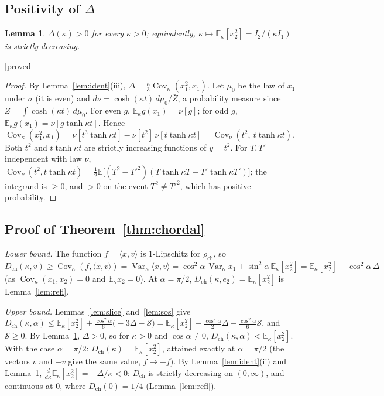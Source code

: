 \documentclass[11pt,a4paper]{article}
\newtheorem{lemma}[theorem]{Lemma}
\theoremstyle{remark}
\theoremstyle{definition}
\theoremstyle{plain}
\theoremstyle{remark}
\newcommand{\E}{\mathbb{E}}
\newcommand{\Cov}{\operatorname{Cov}}
\newcommand{\Var}{\operatorname{Var}}
\newcommand{\st}[1]{\textsf{[#1]}}
\newcommand{\Zb}{\bar Z}
\newcommand{\Dch}{D_{\mathrm{ch}}}
\newcommand{\rch}{\rho_{\mathrm{ch}}}
\begin{document}
\subsection{Positivity of $\Delta$}\label{sec:chdelta}

\begin{lemma}\label{lem:delta}
$\Delta(\kappa)>0$ for every $\kappa>0$; equivalently, $\kappa\mapsto\E_\kappa[x_2^2]=I_2/(\kappa I_1)$ is strictly decreasing.
\end{lemma}
\noindent\st{proved}
\begin{proof}
By Lemma~\ref{lem:ident}(iii), $\Delta=\frac\kappa3\Cov_\kappa(x_1^2,x_1)$. Let $\mu_0$ be the law of $x_1$ under $\bar\sigma$ (it is even) and
$d\nu=\cosh(\kappa t)\,d\mu_0/\Zb$, a probability measure since $\Zb=\int\cosh(\kappa t)\,d\mu_0$. For even $g$, $\E_\kappa g(x_1)=\nu[g]$; for odd $g$,
$\E_\kappa g(x_1)=\nu[g\tanh\kappa t]$. Hence
$\Cov_\kappa(x_1^2,x_1)=\nu[t^3\tanh\kappa t]-\nu[t^2]\,\nu[t\tanh\kappa t]=\Cov_\nu(t^2,\ t\tanh\kappa t)$.
Both $t^2$ and $t\tanh\kappa t$ are strictly increasing functions of $y=t^2$. For $T,T'$ independent with law $\nu$,
$\Cov_\nu(t^2,t\tanh\kappa t)=\frac12\E\big[(T^2-T'^2)(T\tanh\kappa T-T'\tanh\kappa T')\big]$; the integrand is $\ge0$, and $>0$ on the event
$T^2\ne T'^2$, which has positive probability.
\end{proof}

\subsection{Proof of Theorem~\ref{thm:chordal}}\label{sec:chmain}

\emph{Lower bound.} The function $f=\langle x,v\rangle$ is 1-Lipschitz for $\rch$, so $\Dch(\kappa,v)\ge\Cov_\kappa(f,\langle x,v\rangle)=\Var_\kappa\langle x,v\rangle
=\cos^2\!\alpha\,\Var_\kappa x_1+\sin^2\!\alpha\,\E_\kappa[x_2^2]=\E_\kappa[x_2^2]-\cos^2\!\alpha\,\Delta$ (as $\Cov_\kappa(x_1,x_2)=0$ and
$\E_\kappa x_2=0$). At $\alpha=\pi/2$, $\Dch(\kappa,e_2)=\E_\kappa[x_2^2]$ is Lemma~\ref{lem:refl}.

\emph{Upper bound.} Lemmas~\ref{lem:slice} and~\ref{lem:sos} give
$\Dch(\kappa,\alpha)\le\E_\kappa[x_2^2]+\frac{\cos^2\alpha}6\big(-3\Delta-\mathcal S\big)=\E_\kappa[x_2^2]-\frac{\cos^2\alpha}2\Delta-\frac{\cos^2\alpha}6\mathcal S$, and $\mathcal S\ge0$.
By Lemma~\ref{lem:delta}, $\Delta>0$, so for $\kappa>0$ and $\cos\alpha\ne0$, $\Dch(\kappa,\alpha)<\E_\kappa[x_2^2]$. With the case $\alpha=\pi/2$:
$\Dch(\kappa)=\E_\kappa[x_2^2]$, attained exactly at $\alpha=\pi/2$ (the vectors $v$ and $-v$ give the same value, $f\mapsto-f$).
By Lemma~\ref{lem:ident}(ii) and Lemma~\ref{lem:delta}, $\frac{d}{d\kappa}\E_\kappa[x_2^2]=-\Delta/\kappa<0$: $\Dch$ is strictly decreasing on $(0,\infty)$,
and continuous at $0$, where $\Dch(0)=1/4$ (Lemma~\ref{lem:refl}).
\end{document}
